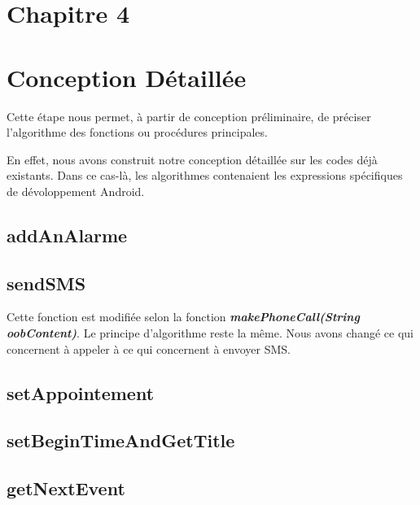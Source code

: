 \section*{Chapitre 4}
\section{Conception Détaillée}
\indent Cette étape nous permet, à partir de conception préliminaire, de préciser l'algorithme des fonctions ou procédures principales.

\indent En effet, nous avons construit notre conception détaillée sur les codes déjà existants. Dans ce cas-là, les algorithmes contenaient les expressions spécifiques de dévoloppement Android.

\subsection{addAnAlarme}
	

\subsection{sendSMS}
	

	Cette fonction est modifiée selon la fonction \textbf{\emph{makePhoneCall(String oobContent)}}. Le principe d'algorithme reste la même. Nous avons changé ce qui concernent à appeler à ce qui concernent à envoyer SMS.

\subsection{setAppointement}
	

\subsection{setBeginTimeAndGetTitle}
	

\subsection{getNextEvent}
	

\newpage
